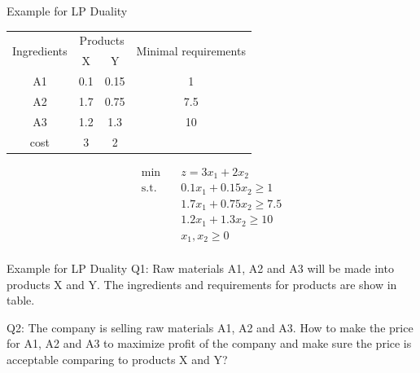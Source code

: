 \documentclass[12pt,notes,mathserif]{beamer}
\begin{document}
\begin{frame}{Example for LP Duality}
	\begin{table}
		\begin{tabular}{cccc}
			\hline
			\multirow{2}{*}{Ingredients} & \multicolumn{2}{c}{Products} & \multirow{2}{*}{Minimal requirements}       \\ \cline{2-3}
			                             & X                            & Y                                     &     \\  \hline \hline
			A1                           & 0.1                          & 0.15                                  & 1   \\
			A2                           & 1.7                          & 0.75                                  & 7.5 \\
			A3                           & 1.2                          & 1.3                                   & 10  \\ \hline
			cost                         & 3                            & 2                                     &     \\ \hline
		\end{tabular}
	\end{table}

	\begin{equation*}
		\begin{aligned}
			\min \quad          & z=3x_1 +2x_2               \\
			\textrm{s.t.} \quad & 0.1x_1 + 0.15x_2 \ge 1     \\
			                    & 1.7 x_1 + 0.75 x_2 \ge 7.5 \\
			                    & 1.2x_1 + 1.3x_2 \ge 10     \\
			                    & x_1, x_2	 \ge 0             \\
		\end{aligned}
	\end{equation*}

\end{frame}

\begin{frame}
	{Example for LP Duality}
	Q1: Raw materials A1, A2 and A3 will be made into products X and Y. The ingredients and requirements for products are show in table.

	Q2: The company is selling raw materials A1, A2 and A3. How to make the price for A1, A2 and A3 to  maximize profit of the company and make sure the price is acceptable comparing to products X and Y?

\end{frame}
\end{document}

